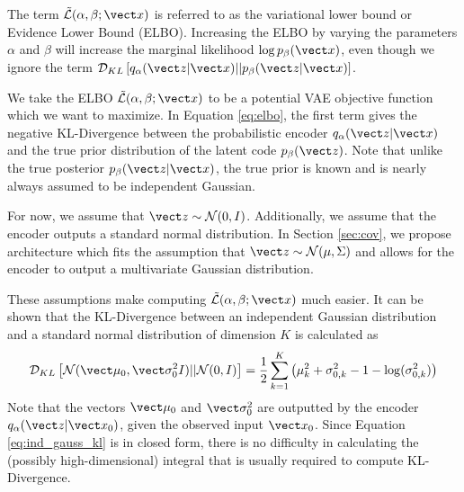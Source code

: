 The term $\tilde{\mathcal{L}}(\alpha, \beta; \vect x)$ is referred to as the variational lower bound or Evidence Lower Bound (ELBO). Increasing the ELBO by varying the parameters $\alpha$ and $\beta$ will increase the marginal likelihood $\log p_\beta(\vect x)$, even though we ignore the term $\mathcal{D}_{KL}\left[ q_\alpha (\vect z | \vect x) || p_\beta(\vect z | \vect x) \right]$.

We take the ELBO $\tilde{\mathcal{L}}(\alpha,\beta; \vect x)$ to be a potential VAE objective function which we want to maximize. In Equation \ref{eq:elbo}, the first term gives the negative KL-Divergence between the probabilistic encoder $q_\alpha(\vect z | \vect x)$ and the true prior distribution of the latent code $p_\beta(\vect z)$. Note that unlike the true posterior $p_\beta(\vect z | \vect x)$, the true prior is known and is nearly always assumed to be independent Gaussian. 

For now, we assume that $\vect z \sim \mathcal{N}(0,I)$. Additionally, we assume that the encoder outputs a standard normal distribution. In Section \ref{sec:cov}, we propose architecture which fits the assumption that $\vect z \sim \mathcal{N}(\mu, \Sigma)$ and allows for the encoder to output a multivariate Gaussian distribution.

These assumptions make computing $\tilde{\mathcal{L}}(\alpha,\beta;\vect x)$ much easier. It can be shown \cite{doersch2016} that  the KL-Divergence between an independent Gaussian distribution and a standard normal distribution of dimension $K$ is calculated as
\begin{equation}
  \mathcal{D}_{KL}\left[ \mathcal{N}(\vect \mu_0, \vect \sigma_0^2I) || \mathcal{N}(0,I) \right] = \frac{1}{2}\sum_{k=1}^K \left( \mu_k^2 + \sigma_{0,k}^2 - 1 - \log(\sigma_{0,k}^2)\right)
  \label{eq:ind_gauss_kl}
\end{equation}
Note that the vectors $\vect \mu_0$ and $\vect \sigma_0^2$ are outputted by the encoder $q_\alpha(\vect z | \vect x_0)$, given the observed input $\vect x_0$. Since Equation \ref{eq:ind_gauss_kl} is in closed form, there is no difficulty in calculating the (possibly high-dimensional) integral that is usually required to compute KL-Divergence.

